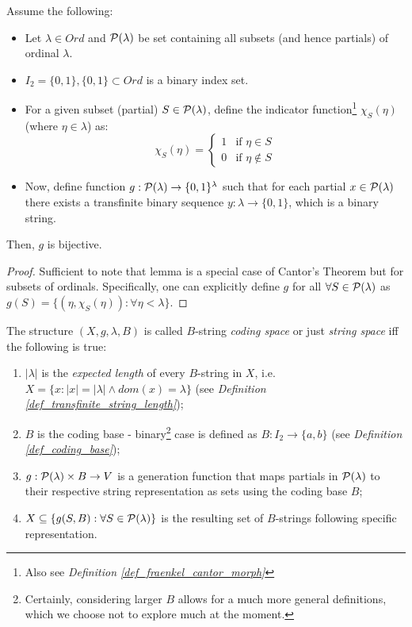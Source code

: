 \begin{lemma}\label{lemma_partials_strings_biject}
    Assume the following:
    \begin{itemize}
        \item Let $\lambda \in Ord$ and $\mathcal{P}(\lambda)$ be set containing all subsets (and hence partials) of ordinal $\lambda$.
        \item $I_2 = \{ 0, 1\}, \{0,1\} \subset Ord$ is a binary index set.
        \item For a given subset (partial) \( S \in \mathcal{P}(\lambda) \), define the indicator function\footnote{Also see \textit{Definition \ref{def_fraenkel_cantor_morph}}} \( \chi_S(\eta) \) (where $\eta \in \lambda$) as:
        \[
            \chi_S(\eta) = \begin{cases} 
            1 & \text{if } \eta \in S \\
            0 & \text{if } \eta \notin S
            \end{cases}
        \]
        \item Now, define function \( g: \mathcal{P}(\lambda) \to \{0,1\}^\lambda \) such that for each partial $x \in \mathcal{P}(\lambda)$ there exists a transfinite binary sequence $y: \lambda \to \{0,1\}$, which is a binary string.
    \end{itemize}
    Then, $g$ is bijective.
\end{lemma}
\begin{proof}
    Sufficient to note that lemma is a special case of Cantor's Theorem but for subsets of ordinals. Specifically, one can explicitly define $g$ for all $\forall S \in \mathcal{P}(\lambda)$ as $g(S) = \{(\eta, \chi_S(\eta)) : \forall \eta < \lambda \}$. 
\end{proof}

\begin{definition}\label{def_coding_space}
    The structure $(X, g, \lambda, B)$ is called $B$-string \textit{coding space} or just \textit{string space} iff the following is true:
    \begin{enumerate}[label=(\roman*)]
        \item $|\lambda|$ is the \textit{expected length} of every $B$-string in $X$, i.e. $X = \{x : |x| = |\lambda| \land dom(x) = \lambda\}$ (see \textit{Definition \ref{def_transfinite_string_length}});
        \item $B$ is the coding base - binary\footnote{Certainly, considering larger $B$ allows for a much more general definitions, which we choose not to explore much at the moment.} case is defined as $B: I_2 \to \{a, b\}$ (see \textit{Definition \ref{def_coding_base}});
        \item $g: \mathcal{P}(\lambda) \times B \to V$ is a generation function that maps partials in $\mathcal{P}(\lambda)$ to their respective string representation as sets using the coding base $B$;
        \item $X \subseteq \{ g(S, B) : \forall S \in \mathcal{P}(\lambda)\}$ is the resulting set of $B$-strings following specific representation.
    \end{enumerate}
\end{definition}

